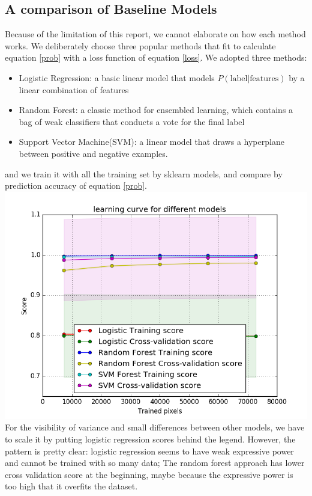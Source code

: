 \documentclass[conference]{IEEEtran}
\begin{document}
\subsection{A comparison of Baseline Models}
Because of the limitation of this report, we cannot elaborate on how each method works. We deliberately choose three popular methods that fit to calculate equation \ref{prob} with a loss function of equation \ref{loss}. We adopted three methods:
\begin{itemize}
\item Logistic Regression: a basic linear model that models $P(\text{label|features})$ by a linear combination of features
\item Random Forest: a classic method for ensembled learning, which contains a bag of weak classifiers that conducts a vote for the final label
\item Support Vector Machine(SVM): a linear model that draws a hyperplane between positive and negative examples.
\end{itemize}
and we train it with all the training set by sklearn models, and compare by prediction accuracy of equation \ref{prob}. 
\includegraphics[scale = 0.4]{myfig.png}
For the visibility of variance and small differences between other models, we have to scale it by putting logistic regression scores behind the legend. However, the pattern is pretty clear: logistic regression seems to have weak expressive power and cannot be trained with so many data; The random forest approach has lower cross validation score at the beginning, maybe because the expressive power is too high that it overfits the dataset. 
\end{document}
